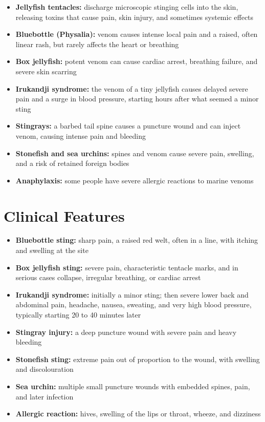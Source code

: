 \begin{itemize}
    \item \textbf{Jellyfish tentacles:} discharge microscopic stinging cells into the skin, releasing toxins that cause pain, skin injury, and sometimes systemic effects
    \item \textbf{Bluebottle (Physalia):} venom causes intense local pain and a raised, often linear rash, but rarely affects the heart or breathing
    \item \textbf{Box jellyfish:} potent venom can cause cardiac arrest, breathing failure, and severe skin scarring
    \item \textbf{Irukandji syndrome:} the venom of a tiny jellyfish causes delayed severe pain and a surge in blood pressure, starting hours after what seemed a minor sting
    \item \textbf{Stingrays:} a barbed tail spine causes a puncture wound and can inject venom, causing intense pain and bleeding
    \item \textbf{Stonefish and sea urchins:} spines and venom cause severe pain, swelling, and a risk of retained foreign bodies
    \item \textbf{Anaphylaxis:} some people have severe allergic reactions to marine venoms
\end{itemize}

\section*{Clinical Features}
\begin{itemize}
    \item \textbf{Bluebottle sting:} sharp pain, a raised red welt, often in a line, with itching and swelling at the site
    \item \textbf{Box jellyfish sting:} severe pain, characteristic tentacle marks, and in serious cases collapse, irregular breathing, or cardiac arrest
    \item \textbf{Irukandji syndrome:} initially a minor sting; then severe lower back and abdominal pain, headache, nausea, sweating, and very high blood pressure, typically starting 20 to 40 minutes later
    \item \textbf{Stingray injury:} a deep puncture wound with severe pain and heavy bleeding
    \item \textbf{Stonefish sting:} extreme pain out of proportion to the wound, with swelling and discolouration
    \item \textbf{Sea urchin:} multiple small puncture wounds with embedded spines, pain, and later infection
    \item \textbf{Allergic reaction:} hives, swelling of the lips or throat, wheeze, and dizziness
\end{itemize}

